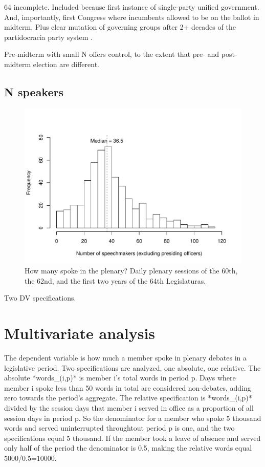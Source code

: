 \documentclass[letter,12pt]{article}
\begin{document}
64 incomplete. Included because first instance of single-party unified government. And, importantly, first Congress where incumbents allowed to be on the ballot in midterm. Plus clear mutation of governing groups after 2+ decades of the partidocracia party system \citep{magar.2007ref.2015,magar.estevez.rosas.2010}. 

Pre-midterm with small N offers control, to the extent that pre- and post-midterm election are different.



\subsection{N speakers}

\begin{figure}
  \centering
    \includegraphics[width=.8\columnwidth]{../plots/nspeakers.pdf}
    \caption{How many spoke in the plenary? Daily plenary sessions of the 60th, the 62nd, and the first two years of the 64th Legislaturas.}\label{F:nspeakers}
\end{figure}





Two DV specifications. 


\section{Multivariate analysis}

The dependent variable is how much a member spoke in plenary debates in a legislative period. Two specifications are analyzed, one absolute, one relative. The absolute *words_(i,p)* is member i's total words in period p. Days where member i spoke less than 50 words in total are considered non-debates, adding zero towards the period's aggregate. The relative specification is *words_(i,p)* divided by the session days that member i served in office as a proportion of all session days in period p. So the denominator for a member who spoke 5 thousand words and served uninterrupted throughtout period p is one, and the two specifications equal 5 thousand. If the member took a leave of absence and served only half of the period the denominator is 0.5, making the relative words equal 5000/0.5=10000.  
\end{document}

